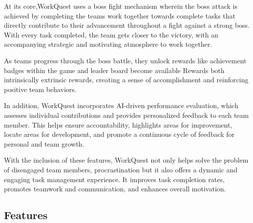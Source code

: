 At its core,WorkQuest uses a boss fight mechanism wherein the boss attack is achieved by completing the teams work together towards
complete tasks that directly contribute to their advancement throughout a fight against a strong boss. With every task completed, the team gets closer to the victory, with an accompanying strategic and motivating atmosphere to work together.

As teams progress through the boss battle, they unlock rewards like achievement badges within the game and leader board become available
Rewards both intrinsically extrinsic rewards, creating a sense of accomplishment and reinforcing positive team behaviors.

In addition, WorkQuest incorporates AI-driven performance evaluation, which assesses individual contributions and provides 
personalized feedback to each team member. This helps ensure accountability, 
highlights areas for improvement, locate areas for development, and promote a continuous cycle of feedback for personal and team growth.

With the inclusion of these features, WorkQuest not only helps solve the problem of disengaged team members, 
procrastination but it also offers a dynamic and engaging task management 
experience. It improves task completion rates, promotes teamwork and communication, and enhances overall motivation.


\subsection{Features}  
\label{subsection:features}  


